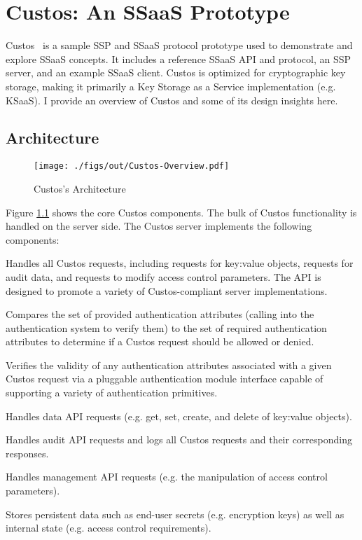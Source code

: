 \chapter{Custos: An SSaaS Prototype}
\label{chap:custos}

Custos~\cite{custos-trios, custos-masters} is a sample SSP and SSaaS
protocol prototype used to demonstrate and explore SSaaS concepts. It
includes a reference SSaaS API and protocol, an SSP server, and an
example SSaaS client. Custos is optimized for cryptographic key
storage, making it primarily a Key Storage as a Service implementation
(e.g. KSaaS). I provide an overview of Custos and some of its design insights
here.

\section{Architecture}
\label{chap:custos:arch}

\begin{figure}[t]
  \centering
  \texttt{[image: ./figs/out/Custos-Overview.pdf]}
  \caption{Custos's Architecture}
  \label{fig:custos-overview}
\end{figure}

Figure \ref{fig:custos-overview} shows the core Custos components. The
bulk of Custos functionality is handled on the server side. The Custos
server implements the following components:

\begin{packed_desc}
\item[API] Handles all Custos requests, including requests for
  key:value objects, requests for audit data, and requests to modify
  access control parameters. The API is designed to promote a variety
  of Custos-compliant server implementations.
\item[Access Control] Compares the set of provided authentication
  attributes (calling into the authentication system to verify them)
  to the set of required authentication attributes to determine if a
  Custos request should be allowed or denied.
\item[Authentication] Verifies the validity of any authentication
  attributes associated with a given Custos request via a pluggable
  authentication module interface capable of supporting a variety of
  authentication primitives.
\item[Data] Handles data API requests (e.g. get, set, create, and
  delete of key:value objects).
\item[Auditing] Handles audit API requests and logs all Custos
  requests and their corresponding responses.
\item[Management] Handles management API requests (e.g. the
  manipulation of access control parameters).
\item[Key-Value Secret Store] Stores persistent data such as end-user
  secrets (e.g. encryption keys) as well as internal state
  (e.g. access control requirements).
\end{packed_desc}


